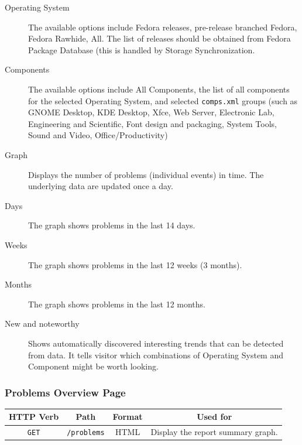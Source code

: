 \documentclass{article}
\begin{document}
\begin{description}
\item[Operating System] The available options include Fedora releases,
  pre-release branched Fedora, Fedora Rawhide, All. The list of
  releases should be obtained from Fedora Package Database (this is
  handled by Storage Synchronization.
\item[Components] The available options include All Components, the
  list of all components for the selected Operating System, and
  selected \texttt{comps.xml} groups (such as GNOME Desktop, KDE
  Desktop, Xfce, Web Server, Electronic Lab, Engineering and
  Scientific, Font design and packaging, System Tools, Sound and
  Video, Office/Productivity)
\item[Graph] Displays the number of problems (individual events) in
  time. The underlying data are updated once a day.
\item[Days] The graph shows problems in the last 14 days.
\item[Weeks] The graph shows problems in the last 12 weeks (3 months).
\item[Months] The graph shows problems in the last 12 months.
\item[New and noteworthy] Shows automatically discovered interesting
  trends that can be detected from data.  It tells visitor which
  combinations of Operating System and Component might be worth
  looking.
\end{description}

\subsubsection{Problems Overview Page}

\begin{center}
\begin{tabular}{|c|c|c|c|}
\hline
HTTP Verb & Path & Format & Used for \\
\hline
\texttt{GET} & \texttt{/problems} & HTML & Display the report summary graph. \\
\hline
\end{tabular}
\end{center}
\end{document}
